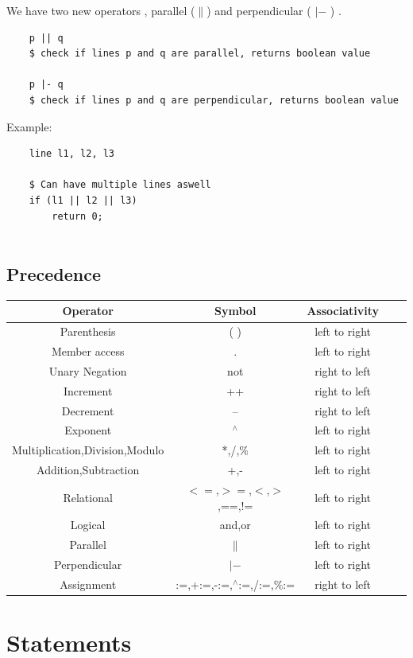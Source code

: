 \documentclass[12pt]{article}
\begin{document}
We have two new operators , parallel ($\parallel$) and perpendicular ( $|-$ ) .
\begin{verbatim}
    p || q              
    $ check if lines p and q are parallel, returns boolean value 

    p |- q
    $ check if lines p and q are perpendicular, returns boolean value 
\end{verbatim}
Example:
\begin{verbatim}
    line l1, l2, l3 

    $ Can have multiple lines aswell
    if (l1 || l2 || l3)
        return 0;
        
\end{verbatim}
\subsection{Precedence}
\begin{center}
\begin{tabular}{ | c | c | c| c | c |} 
  \hline
  Operator & Symbol & Associativity \\ 
  \hline
Parenthesis & ( ) & left to right  \\
Member access & . & left to right \\
Unary Negation & not & right to left  \\
Increment & ++ & right to left  \\
Decrement & -- & right to left  \\
Exponent & ${}^\wedge$ & left to right  \\
Multiplication,Division,Modulo & *,/,\% & left to right  \\
Addition,Subtraction & +,- & left to right  \\
Relational & $<=$,$>=$,$<$,$>$,==,!= & left to right  \\
Logical & and,or & left to right  \\
Parallel & $\parallel$ & left to right  \\
Perpendicular & $|-$ & left to right  \\
Assignment  & :=,+:=,-:=,${}^\wedge$:=,/:=,\%:= & right to left  \\
\hline
\end{tabular}
\end{center}

\section{Statements}
\end{document}
